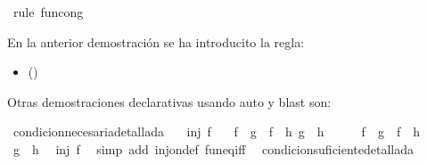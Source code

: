 \begin{isabellebody}
\ {\isacharparenleft}rule\ fun{\isacharunderscore}cong{\isacharparenright}\isanewline
{}\isamarkupfalse%
%
\endisatagproof
{\isafoldproof}%
%
\isadelimproof
%
\endisadelimproof
%
\begin{isamarkuptext}%
En la anterior demostración se ha introducito la regla: 
  \begin{itemize}
    \item[]  
      \hfill ()
  \end{itemize}
Otras demostraciones declarativas usando auto y blast son:%
\end{isamarkuptext}\isamarkuptrue%
\isamarkupfalse%
\ condicion{\isacharunderscore}necesaria{\isacharunderscore}detallada{}{\isacharcolon}\isanewline
\ \ \ {\isachardoublequoteopen}inj\ f{\isachardoublequoteclose}\isanewline
\ \ \ {\isachardoublequoteopen}{\isacharparenleft}f\ {\isasymcirc}\ g\ {\isacharequal}\ f\ {\isasymcirc}\ h{\isacharparenright}\ {\isasymlongrightarrow}{\isacharparenleft}g\ {\isacharequal}\ h{\isacharparenright}{\isachardoublequoteclose}\isanewline
%
\isadelimproof
%
\endisadelimproof
%
\isatagproof
{}\isamarkupfalse%
\ \isanewline
\ \ \isamarkupfalse%
\ {\isachardoublequoteopen}f\ {\isasymcirc}\ g\ {\isacharequal}\ f\ {\isasymcirc}\ h{\isachardoublequoteclose}\ \isanewline
\ \ \isamarkupfalse%
\ \isamarkupfalse%
\ {\isachardoublequoteopen}g\ {\isacharequal}\ h{\isachardoublequoteclose}\ \isamarkupfalse%
\ {\isacharbackquoteopen}inj\ f{\isacharbackquoteclose}\ \isamarkupfalse%
\ {\isacharparenleft}simp\ add{\isacharcolon}\ inj{\isacharunderscore}on{\isacharunderscore}def\ fun{\isacharunderscore}eq{\isacharunderscore}iff{\isacharparenright}\ \isanewline
{}\isamarkupfalse%
%
\endisatagproof
{\isafoldproof}%
%
\isadelimproof
\isanewline
%
\endisadelimproof
\isanewline
{}\isamarkupfalse%
\ condicion{\isacharunderscore}suficiente{\isacharunderscore}detallada{}{\isacharcolon}\isanewline

\end{isabellebody}
